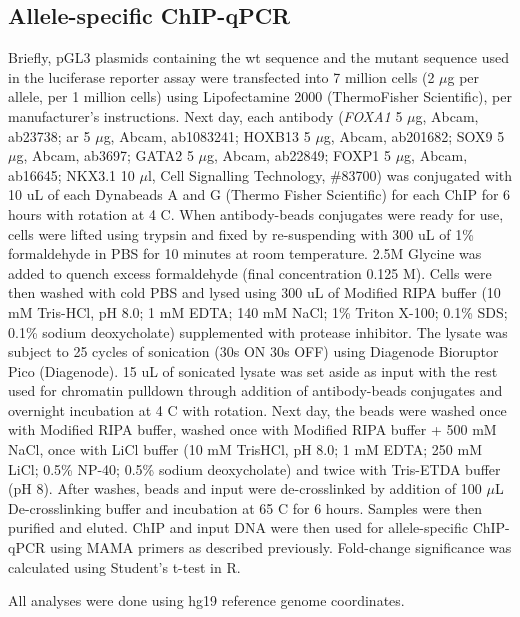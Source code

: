 \subsection{Allele-specific ChIP-qPCR}

Briefly, pGL3 plasmids containing the \gls{wt} sequence and the mutant sequence used in the luciferase reporter assay were transfected into 7 million cells (2 $\mu$g per allele, per 1 million cells) using Lipofectamine 2000 (ThermoFisher Scientific), per manufacturer's instructions.
Next day, each antibody (\emph{FOXA1} 5 $\mu$g, Abcam, ab23738; \gls{ar} 5 $\mu$g, Abcam, ab1083241; HOXB13 5 $\mu$g, Abcam, ab201682; SOX9 5 $\mu$g, Abcam, ab3697; GATA2 5 $\mu$g, Abcam, ab22849; FOXP1 5 $\mu$g, Abcam, ab16645; NKX3.1 10 $\mu$l, Cell Signalling Technology, \#83700) was conjugated with 10 uL of each Dynabeads A and G (Thermo Fisher Scientific) for each ChIP for 6 hours with rotation at 4 \textdegree C.
When antibody-beads conjugates were ready for use, cells were lifted using trypsin and fixed by re-suspending with 300 uL of 1\% formaldehyde in PBS for 10 minutes at room temperature.
2.5M Glycine was added to quench excess formaldehyde (final concentration 0.125 M).
Cells were then washed with cold PBS and lysed using 300 uL of Modified RIPA buffer (10 mM Tris-HCl, pH 8.0; 1 mM EDTA; 140 mM NaCl; 1\% Triton X-100; 0.1\% SDS; 0.1\% sodium deoxycholate) supplemented with protease inhibitor.
The lysate was subject to 25 cycles of sonication (30s ON 30s OFF) using Diagenode Bioruptor Pico (Diagenode).
15 uL of sonicated lysate was set aside as input with the rest used for chromatin pulldown through addition of antibody-beads conjugates and overnight incubation at 4 \textdegree C with rotation.
Next day, the beads were washed once with Modified RIPA buffer, washed once with Modified RIPA buffer + 500 mM NaCl, once with LiCl buffer (10 mM TrisHCl, pH 8.0; 1 mM EDTA; 250 mM LiCl; 0.5\% NP-40; 0.5\% sodium deoxycholate) and twice with Tris-ETDA buffer (pH 8).
After washes, beads and input were de-crosslinked by addition of 100 $\mu$L De-crosslinking buffer and incubation at 65 \textdegree C for 6 hours.
Samples were then purified and eluted.
ChIP and input DNA were then used for allele-specific ChIP-qPCR using MAMA primers as described previously.
Fold-change significance was calculated using Student's t-test in R.

All analyses were done using hg19 reference genome coordinates.
